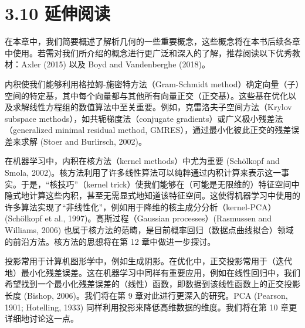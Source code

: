 \section*{3.10 延伸阅读}
\label{sec:3.10}

在本章中，我们简要概述了解析几何的一些重要概念，这些概念将在本书后续各章中使用。若需对我们所介绍的概念进行更广泛和深入的了解，推荐阅读以下优秀教材：Axler (2015) 以及 Boyd and Vandenberghe (2018)。

内积使我们能够利用格拉姆-施密特方法（Gram-Schmidt method）确定向量（子）空间的特定基，其中每个向量都与其他所有向量正交（正交基）。这些基在优化以及求解线性方程组的数值算法中至关重要。例如，克雷洛夫子空间方法（Krylov subspace methods），如共轭梯度法（conjugate gradients）或广义极小残差法（generalized minimal residual method, GMRES），通过最小化彼此正交的残差误差来求解 (Stoer and Burlirsch, 2002)。

在机器学习中，内积在核方法（kernel methods）中尤为重要 (Schölkopf and Smola, 2002)。核方法利用了许多线性算法可以纯粹通过内积计算来表示这一事实。于是，“核技巧”（kernel trick）使我们能够在（可能是无限维的）特征空间中隐式地计算这些内积，甚至无需显式地知道该特征空间。这使得机器学习中使用的许多算法实现了“非线性化”，例如用于降维的核主成分分析（kernel-PCA）(Schölkopf et al., 1997)。高斯过程（Gaussian processes）(Rasmussen and Williams, 2006) 也属于核方法的范畴，是目前概率回归（数据点曲线拟合）领域的前沿方法。核方法的思想将在第 12 章中做进一步探讨。

投影常用于计算机图形学中，例如生成阴影。在优化中，正交投影常用于（迭代地）最小化残差误差。这在机器学习中同样有重要应用，例如在线性回归中，我们希望找到一个最小化残差误差的（线性）函数，即数据到该线性函数上的正交投影长度 (Bishop, 2006)。我们将在第 9 章对此进行更深入的研究。PCA (Pearson, 1901; Hotelling, 1933) 同样利用投影来降低高维数据的维度。我们将在第 10 章更详细地讨论这一点。
